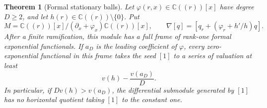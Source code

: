 \documentclass[11pt]{article}
\newtheorem{theorem}{Theorem}[section]
\theoremstyle{definition}\newtheorem{definition}[theorem]{Definition}
\theoremstyle{remark}\newtheorem{remark}[theorem]{Remark}
\newcommand{\C}{\mathbb C}
\begin{document}
\begin{theorem}[Formal stationary balls]\label{thm:stationaryballs}
Let $\varphi(r,x)\in\C((r))[x]$ have degree $D\geq2$, and let
$h(r)\in\C((r))\setminus\{0\}$. Put
\[
 M=\C((r))[x]/(\partial_x+\varphi_x)\C((r))[x],\qquad
 \nabla[q]=[q_r+(\varphi_r+h'/h)q].
\]
After a finite ramification, this module has a full frame of rank-one
formal exponential functionals. If $a_D$ is the leading coefficient
of $\varphi$, every zero-exponential functional in this frame takes
the seed $[1]$ to a series of valuation at least
\begin{equation}\label{eq:valuationbound}
 v(h)-\frac{v(a_D)}D.
\end{equation}
In particular, if $Dv(h)>v(a_D)$, the differential submodule generated
by $[1]$ has no horizontal quotient taking $[1]$ to the constant one.
\end{theorem}
\end{document}

